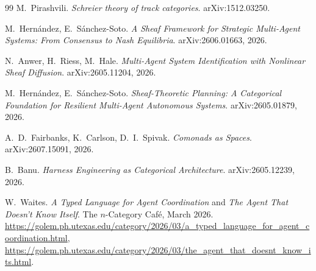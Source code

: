 \documentclass[11pt]{amsart}
\theoremstyle{definition}
\theoremstyle{remark}
\begin{document}
\begin{thebibliography}{99}
 M.~Pirashvili. \emph{Schreier theory of track categories}. arXiv:1512.03250.

 M.~Hern\'andez, E.~S\'anchez-Soto. \emph{A Sheaf Framework for Strategic
Multi-Agent Systems: From Consensus to Nash Equilibria}. arXiv:2606.01663, 2026.

 N.~Anwer, H.~Riess, M.~Hale. \emph{Multi-Agent System Identification with
Nonlinear Sheaf Diffusion}. arXiv:2605.11204, 2026.

 M.~Hern\'andez, E.~S\'anchez-Soto. \emph{Sheaf-Theoretic Planning: A
Categorical Foundation for Resilient Multi-Agent Autonomous Systems}. arXiv:2605.01879, 2026.

 A.~D.~Fairbanks, K.~Carlson, D.~I.~Spivak. \emph{Comonads as Spaces}.
arXiv:2607.15091, 2026.

 B.~Banu. \emph{Harness Engineering as Categorical Architecture}.
arXiv:2605.12239, 2026.

 W.~Waites. \emph{A Typed Language for Agent Coordination} and \emph{The Agent That
Doesn't Know Itself}. The $n$-Category Caf\'e, March 2026.
\url{https://golem.ph.utexas.edu/category/2026/03/a_typed_language_for_agent_coordination.html},
\url{https://golem.ph.utexas.edu/category/2026/03/the_agent_that_doesnt_know_its.html}.

\end{thebibliography}
\end{document}
